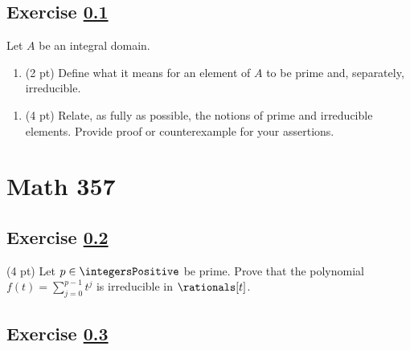 \spaceSolution{2.5in}{%
}%



\subsection{Exercise \ref{sec : me00rtQ3}}
\label{sec : me00rtQ3}

Let $A$ be an integral domain.

\begin{enumerate}[label=(\alph*)]
\item\label{itm : me00rtQ3a} (2 pt) Define what it means for an element of $A$ to be prime and, separately, irreducible.
\end{enumerate}

\spaceSolution{2in}{%
}%

\begin{enumerate}[label=(\alph*)]
\item\label{itm : me00rtQ3b} (4 pt) Relate, as fully as possible, the notions of prime and irreducible elements. Provide proof or counterexample for your assertions.
\end{enumerate}

\spaceSolution{3in}{%
}%





%
%

\section*{Math 357}

\subsection{Exercise \ref{sec : me00tcQ1}}
\label{sec : me00tcQ1}


(4 pt) Let $p \in \integersPositive$ be prime. Prove that the polynomial $f(t) = \sum_{j = 0}^{p - 1} t^{j}$ is irreducible in $\rationals[t]$.

\spaceSolution{2in}{%
}%



\subsection{Exercise \ref{sec : me00tcQ2}}
\label{sec : me00tcQ2}

